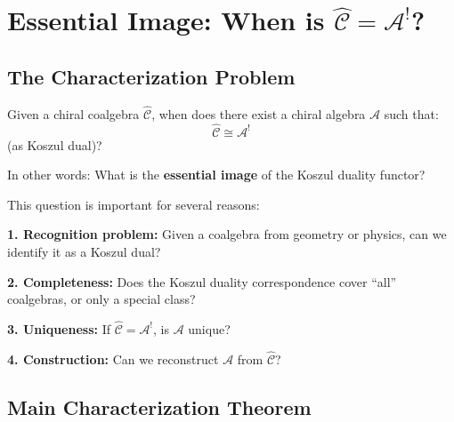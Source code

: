
\section{Essential Image: When is $\widehat{\mathcal{C}} = \mathcal{A}^!$?}
\label{sec:essential-image-koszul}

\subsection{The Characterization Problem}

\begin{question}\label{q:inverse-problem-koszul}
Given a chiral coalgebra $\widehat{\mathcal{C}}$, when does there exist a chiral 
algebra $\mathcal{A}$ such that:
$$\widehat{\mathcal{C}} \cong \mathcal{A}^!$$
(as Koszul dual)?

In other words: What is the \textbf{essential image} of the Koszul duality functor?
\end{question}

\begin{remark}\label{rem:why-essential-image-matters}
This question is important for several reasons:

\textbf{1. Recognition problem:}
Given a coalgebra from geometry or physics, can we identify it as a Koszul dual?

\textbf{2. Completeness:}
Does the Koszul duality correspondence cover ``all'' coalgebras, or only a special class?

\textbf{3. Uniqueness:}
If $\widehat{\mathcal{C}} = \mathcal{A}^!$, is $\mathcal{A}$ unique?

\textbf{4. Construction:}
Can we reconstruct $\mathcal{A}$ from $\widehat{\mathcal{C}}$?
\end{remark}

\subsection{Main Characterization Theorem}

